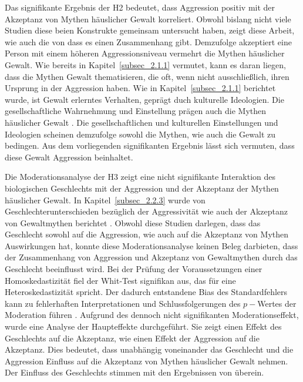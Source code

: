 Das signifikante Ergebnis der H2 bedeutet, dass Aggression positiv mit der Akzeptanz von Mythen häuslicher Gewalt korreliert. Obwohl bislang nicht viele Studien diese beien Konstrukte gemeinsam untersucht haben, zeigt diese Arbeit, wie auch die von \textcite{H2_u_3_Bhogal_2016, H1_moderation_2020} dass es einen Zusammenhang gibt. Demzufolge akzeptiert eine Person mit einem höheren Aggressionsniveau vermehrt die Mythen häuslicher Gewalt. Wie bereits in Kapitel~\ref{subsec_2.1.1} vermutet, kann es daran liegen, dass die Mythen Gewalt thematisieren, die oft, wenn nicht ausschließlich, ihren Ursprung in der Aggression haben. Wie \textcite{Def_Aggressivität_vs_violence} in Kapitel~\ref{subsec_2.1.1} berichtet wurde, ist Gewalt erlerntes Verhalten, geprägt duch kulturelle Ideologien. Die gesellschaftliche Wahrnehmung und Einstellung prägen auch die Mythen häuslicher Gewalt \parencite{Labelingtheory_plus, DVMAS_Peters}. Die gesellschaftlichen und kulturellen Einstellungen und Ideologien scheinen demzufolge sowohl die Mythen, wie auch die Gewalt zu bedingen. Aus dem vorliegenden signifikanten Ergebnis lässt sich vermuten, dass diese Gewalt Aggression beinhaltet.


Die Moderationsanalyse der H3 zeigt eine nicht signifikante Interaktion des biologischen Geschlechts mit der Aggression und der Akzeptanz der Mythen häuslicher Gewalt. In Kapitel~\ref{subsec_2.2.3} wurde von Geschlechterunterschieden bezüglich der Aggressivität wie auch der Akzeptanz von Gewaltmythen berichtet \parencite{H2_u_3_Bhogal_2016, H3_MFUnterschied, H3_2020}. Obwohl diese Studien darlegen, dass das Geschlecht sowohl auf die Aggression, wie auch auf die Akzeptanz von Mythen Auswirkungen hat, konnte diese Moderationsanalyse keinen Beleg darbieten, dass der Zusammenhang von Aggression und Akzeptanz von Gewaltmythen durch das Geschlecht beeinflusst wird. Bei der Prüfung der Voraussetzungen einer Homoskedastizität fiel der Whit-Test signifikan aus, das für eine Heteroskedastizität spricht. Der dadurch entstandene Bias des Standardfehlers kann zu fehlerhaften Interpretationen und Schlussfolgerungen des $p-$Wertes der Moderation führen \parencite{Voraussetzung_Moderation}. 
Aufgrund des dennoch nicht signifikanten Moderationseffekt, wurde eine Analyse der Haupteffekte durchgeführt. Sie zeigt einen Effekt des Geschlechts auf die Akzeptanz, wie einen Effekt der Aggression auf die Akzeptanz. Dies bedeutet, dass unabhängig voneinander das Geschlecht und die Aggression Einfluss auf die Akzeptanz von Mythen häuslicher Gewalt nehmen. Der Einfluss des Geschlechts stimmen mit den Ergebnissen von \textcite{H3_2020} überein.


